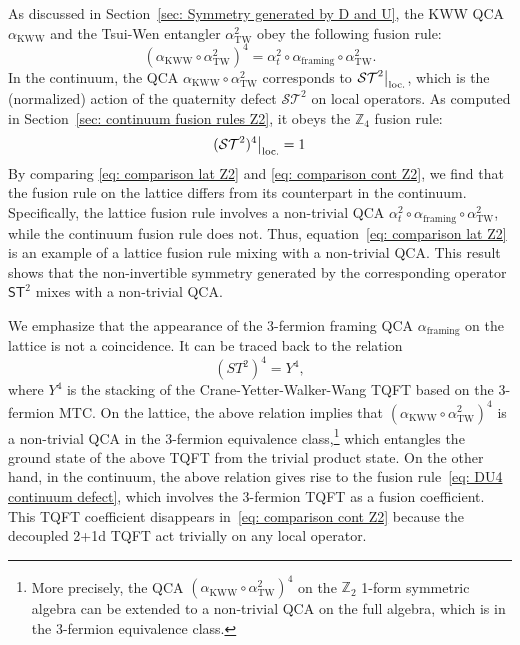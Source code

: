 \documentclass[aps,twocolumn,prx,floatfix,preprintnumbers, nofootinbib,10pt]{revtex4-2}
\numberwithin{equation}{section}
\theoremstyle{definition}
\theoremstyle{remark}
\theoremstyle{claim}
\newcommand{\be}{\begin{equation}}
\newcommand{\ee}{\end{equation}}
\newcommand{\mc}[1]{\mathcal{#1}}
\newcommand\restr[2]{{%
  \left.\kern-\nulldelimiterspace %
  #1 %
  \right|_{#2} %
}}
\newcommand{\opaction}[1]{\restr{#1}{\text{loc.}}}
\begin{document}
As discussed in Section~\ref{sec: Symmetry generated by D and U}, the KWW QCA $\alpha_{\mathrm{KWW}}$ and the Tsui-Wen entangler $\alpha_{\mathrm{TW}}^2$ obey the following fusion rule:
\begin{equation}
(\alpha_{\mathrm{KWW}} \circ \alpha_{\mathrm{TW}}^2)^4 = \alpha_t^2 \circ \alpha_{\mathrm{framing}} \circ \alpha_{\mathrm{TW}}^2.
\label{eq: comparison lat Z2}
\end{equation}
In the continuum, the QCA $\alpha_{\mathrm{KWW}} \circ \alpha_{\mathrm{TW}}^2$ corresponds to $\opaction{\mc{ST}^2}$, which is the (normalized) action of the quaternity defect $\mathcal{S}\mathcal{T}^2$ on local operators.
As computed in Section~\ref{sec: continuum fusion rules Z2}, it obeys the $\mathbb{Z}_4$ fusion rule:
\be\label{eq: comparison cont Z2}
\opaction{(\mc{ST}^2)^4} = 1
\ee
By comparing \eqref{eq: comparison lat Z2} and \eqref{eq: comparison cont Z2}, we find that the fusion rule on the lattice differs from its counterpart in the continuum.
Specifically, the lattice fusion rule involves a non-trivial QCA $\alpha_t^2 \circ \alpha_{\mathrm{framing}} \circ \alpha_{\mathrm{TW}}^2$, while the continuum fusion rule does not.
Thus, equation~\eqref{eq: comparison lat Z2} is an example of a lattice fusion rule mixing with a non-trivial QCA.
This result shows that the non-invertible symmetry generated by the corresponding operator $\mathsf{S}\mathsf{T}^2$ mixes with a non-trivial QCA.

We emphasize that the appearance of the 3-fermion framing QCA $\alpha_{\mathrm{framing}}$ on the lattice is not a coincidence.
It can be traced back to the relation
\begin{equation}
(ST^2)^4 = Y^4,
\end{equation}
where $Y^4$ is the stacking of the Crane-Yetter-Walker-Wang TQFT based on the 3-fermion MTC.
On the lattice, the above relation implies that $(\alpha_{\mathrm{KWW}} \circ \alpha_{\mathrm{TW}}^2)^4$ is a non-trivial QCA in the 3-fermion equivalence class,\footnote{More precisely, the QCA $(\alpha_{\mathrm{KWW}} \circ \alpha_{\mathrm{TW}}^2)^4$ on the $\mathbb{Z}_2$ 1-form symmetric algebra can be extended to a non-trivial QCA on the full algebra, which is in the 3-fermion equivalence class.} which entangles the ground state of the above TQFT from the trivial product state.
On the other hand, in the continuum, the above relation gives rise to the fusion rule~\eqref{eq: DU4 continuum defect}, which involves the 3-fermion TQFT as a fusion coefficient.
This TQFT coefficient disappears in~\eqref{eq: comparison cont Z2} because the decoupled 2+1d TQFT act trivially on any local operator.
\end{document}
